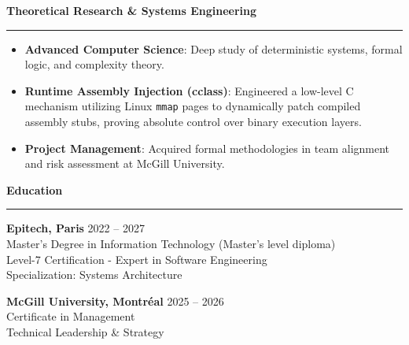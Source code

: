 \documentclass[9pt]{extarticle}
\begin{document}
{\large\bfseries Theoretical Research \& Systems Engineering}
\par\vspace{-8pt}
\rule{\linewidth}{0.4pt}
\par\vspace{5pt}
\begin{itemize}[noitemsep, topsep=0pt]
    \item {\bfseries Advanced Computer Science}: Deep study of deterministic systems, formal logic, and complexity theory.
    \item {\bfseries Runtime Assembly Injection (cclass)}: Engineered a low-level C mechanism utilizing Linux \texttt{mmap} pages to dynamically patch compiled assembly stubs, proving absolute control over binary execution layers.
    \item {\bfseries Project Management}: Acquired formal methodologies in team alignment and risk assessment at McGill University.
\end{itemize}

\par\vspace{5pt}

{\large\bfseries Education}
\par\vspace{-8pt}
\rule{\linewidth}{0.4pt}
\par\vspace{5pt}

{\bfseries Epitech, Paris} \hfill 2022 -- 2027 \\
Master's Degree in Information Technology (Master's level diploma) \\
Level-7 Certification - Expert in Software Engineering \\
Specialization: Systems Architecture \\

\vspace{4pt}

{\bfseries McGill University, Montréal} \hfill 2025 -- 2026 \\
Certificate in Management \\
Technical Leadership \& Strategy
\end{document}
